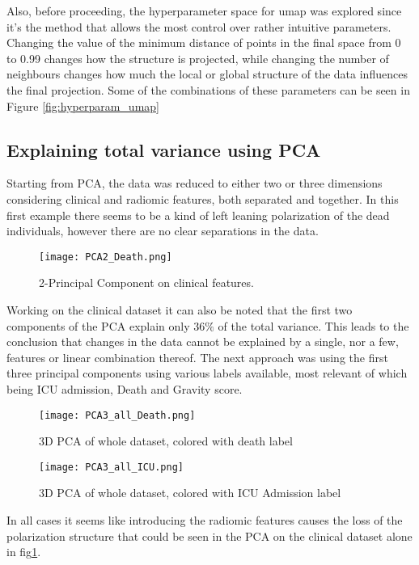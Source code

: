 Also, before proceeding, the hyperparameter space for umap was explored since it's the method that allows the most control over rather intuitive parameters.
Changing the value of the minimum distance of points in the final space from 0 to 0.99 changes how the structure is projected, while changing the number of neighbours changes how much the local or global structure of the data influences the final projection.
 Some of the combinations of these parameters can be seen in Figure \ref{fig:hyperparam_umap}


\subsection{Explaining total variance using PCA}

Starting from PCA, the data was reduced to either two or three dimensions considering clinical and radiomic features, both separated and together.
In this first example there seems to be a kind of left leaning polarization of the dead individuals, however there are no clear separations in the data.

\begin{figure}[h!]
\centering
  		\texttt{[image: PCA2\_Death.png]}
        \caption{2-Principal Component on clinical features.  \label{fig:PCA2_death}}
\end{figure}

 Working on the clinical dataset it can also be noted that the first two components of the PCA explain only 36$\%$ of the total variance. This leads to the conclusion that changes in the data cannot be explained by a single, nor a few, features or linear combination thereof. The next approach was  using the first three principal components using various labels available, most relevant of which being ICU admission, Death and Gravity score.

\begin{figure}[h!]
  		\texttt{[image: PCA3\_all\_Death.png]}\label{PCA3_all_death}
  		\caption{3D PCA of whole dataset, colored with death label}
\end{figure}

\begin{figure}[h!]
  		\texttt{[image: PCA3\_all\_ICU.png]}\label{PCA3_all_ICU}
  		\caption{3D PCA of whole dataset, colored with ICU Admission label}
\end{figure}

In all cases it seems like introducing the radiomic features causes the loss of the polarization structure that could be seen in the PCA on the clinical dataset alone in fig\ref{fig:PCA2_death}.
 
